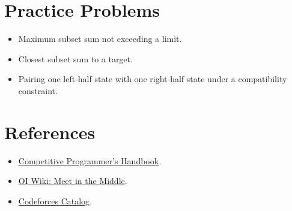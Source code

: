\section*{Practice Problems}

\begin{itemize}
  \item Maximum subset sum not exceeding a limit.
  \item Closest subset sum to a target.
  \item Pairing one left-half state with one right-half state under a compatibility constraint.
\end{itemize}

\section*{References}

\begin{itemize}
  \item \href{https://usaco.guide/CPH.pdf}{Competitive Programmer's Handbook}.
  \item \href{https://oi-wiki.org/search/mitm/}{OI Wiki: Meet in the Middle}.
  \item \href{https://codeforces.com/catalog}{Codeforces Catalog}.
\end{itemize}
